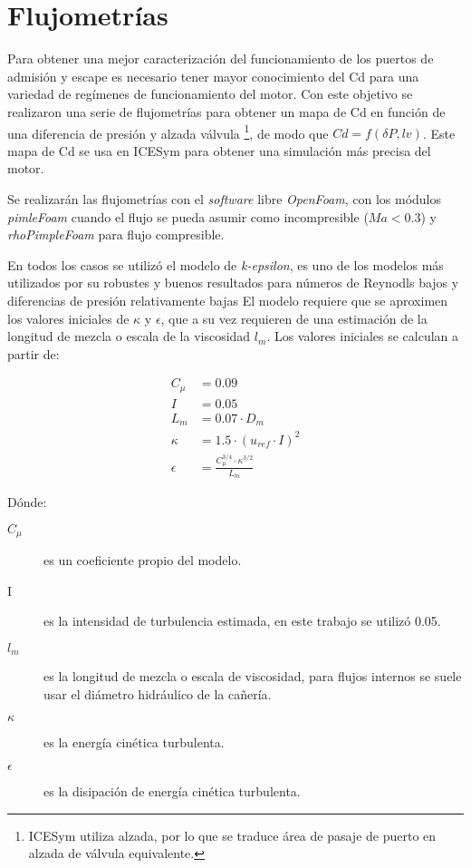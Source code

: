 \chapter{Flujometrías}
%
%
Para obtener una mejor caracterización del funcionamiento de los puertos de
admisión y escape es necesario tener mayor conocimiento del Cd para una
variedad de regímenes de funcionamiento del motor.
%
Con este objetivo se realizaron una serie de flujometrías para obtener un mapa
de Cd en función de una diferencia de presión y alzada válvula \footnote{ICESym
utiliza alzada, por lo que se traduce área de pasaje de puerto en alzada de
válvula equivalente.}, de modo que $Cd = f(\delta P,lv)$.
%
Este mapa de Cd se usa en ICESym para obtener una simulación más precisa del
motor.

Se realizarán las flujometrías con el \emph{software} libre  \emph{OpenFoam},
con los módulos \emph{pimleFoam} cuando el flujo se pueda asumir como
incompresible ($Ma < 0.3$) y \emph{rhoPimpleFoam} para flujo compresible.

En todos los casos se utilizó el modelo de \emph{k-epsilon}, es uno de los
modelos más utilizados por su robustes y buenos resultados para números de
Reynodls bajos y diferencias de presión relativamente bajas\cite{wilcox}
%
El modelo requiere que se aproximen los valores iniciales de $\kappa$ y
$\epsilon$, que a su vez requieren de una estimación de la longitud de mezcla o
escala de la viscosidad $l_m$.
%
Los valores iniciales se calculan a partir de:


\begin{align}
    C_{\mu}  &= 0.09 \\
    I        &= 0.05 \\
    L_m      &= 0.07 \cdot D_m \\
    \kappa   &= 1.5 \cdot \left( u_{ref} \cdot I \right) ^ 2 \\
    \epsilon &= \frac{C_\mu ^{3/4} \cdot \kappa ^{3/2}} {L_m}
\end{align}

Dónde:
%
\begin{description}
    \item[$C_{\mu}$] es un coeficiente propio del modelo.
    \item[I] es la intensidad de turbulencia estimada, en este trabajo se utilizó 0.05.
    \item[$l_m$] es la longitud de mezcla o escala de viscosidad,
     para flujos internos se suele usar el diámetro hidráulico de la cañería.
    \item[$\kappa$] es la energía cinética turbulenta.
    \item[$\epsilon$] es la disipación de energía cinética turbulenta.
\end{description}

